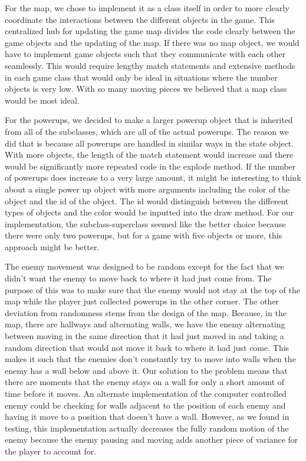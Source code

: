 \documentclass[12pt]{article}
\begin{document}
\vspace{\baselineskip}
For the map, we chose to implement it as a class itself in order to more clearly coordinate the interactions between the different objects in the game. This centralized hub for updating the game map divides the code clearly between the game objects and the updating of the map. If there was no map object, we would have to implement game objects such that they communicate with each other seamlessly. This would require lengthy match statements and extensive methods in each game class that would only be ideal in situations where the number objects is very low. With so many moving pieces we believed that a map class would be most ideal. \par


\vspace{\baselineskip}
For the powerups, we decided to make a larger powerup object that is inherited from all of the subclasses, which are all of the actual powerups. The reason we did that is because all powerups are handled in similar ways in the state object. With more objects, the length of the match statement would increase and there would be significantly more repeated code in the explode method. If the number of powerups does increase to a very large amount, it might be interesting to think about a single power up object with more arguments including the color of the object and the id of the object. The id would distinguish between the different types of objects and the color would be inputted into the draw method. For our implementation, the subclass-superclass seemed like the better choice because there were only two powerups, but for a game with five objects or more, this approach might be better.\par


\vspace{\baselineskip}
The enemy movement was designed to be random except for the fact that we didn’t want the enemy to move back to where it had just come from. The purpose of this was to make sure that the enemy would not stay at the top of the map while the player just collected powerups in the other corner. The other deviation from randomness stems from the design of the map. Because, in the map, there are hallways and alternating walls, we have the enemy alternating between moving in the same direction that it had just moved in and taking a random direction that would not move it back to where it had just come. This makes it such that the enemies don’t constantly try to move into walls when the enemy has a wall below and above it. Our solution to the problem means that there are moments that the enemy stays on a wall for only a short amount of time before it moves. An alternate implementation of the computer controlled enemy could be checking for walls adjacent to the position of each enemy and having it move to a position that doesn’t have a wall. However, as we found in testing, this implementation actually decreases the fully random motion of the enemy because the enemy pausing and moving adds another piece of variance for the player to account for.\par
\end{document}
